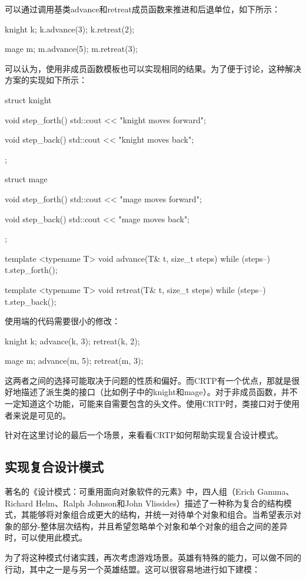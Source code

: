 可以通过调用基类advance和retreat成员函数来推进和后退单位，如下所示：

\begin{cpp}
knight k;
k.advance(3);
k.retreat(2);

mage m;
m.advance(5);
m.retreat(3);
\end{cpp}

可以认为，使用非成员函数模板也可以实现相同的结果。为了便于讨论，这种解决方案的实现如下所示：

\begin{cpp}
struct knight
{
	void step_forth()
	{ std::cout << "knight moves forward\n"; }
	
	void step_back()
	{ std::cout << "knight moves back\n"; }
};

struct mage
{
	void step_forth()
	{ std::cout << "mage moves forward\n"; }
	
	void step_back()
	{ std::cout << "mage moves back\n"; }
};

template <typename T>
void advance(T& t, size_t steps)
{
	while (steps--) t.step_forth();
}

template <typename T>
void retreat(T& t, size_t steps)
{
	while (steps--) t.step_back();
}
\end{cpp}

使用端的代码需要很小的修改：

\begin{cpp}
knight k;
advance(k, 3);
retreat(k, 2);

mage m;
advance(m, 5);
retreat(m, 3);
\end{cpp}

这两者之间的选择可能取决于问题的性质和偏好。而CRTP有一个优点，那就是很好地描述了派生类的接口（比如例子中的knight和mage）。对于非成员函数，并不一定知道这个功能，可能来自需要包含的头文件。使用CRTP时，类接口对于使用者来说是可见的。

针对在这里讨论的最后一个场景，来看看CRTP如何帮助实现复合设计模式。

\subsection{实现复合设计模式}

著名的《设计模式：可重用面向对象软件的元素》中，四人组（Erich Gamma、Richard Helm、Ralph Johnson和John Vlissides）描述了一种称为复合的结构模式，其能够将对象组合成更大的结构，并统一对待单个对象和组合。当希望表示对象的部分-整体层次结构，并且希望忽略单个对象和单个对象的组合之间的差异时，可以使用此模式。

为了将这种模式付诸实践，再次考虑游戏场景。英雄有特殊的能力，可以做不同的行动，其中之一是与另一个英雄结盟。这可以很容易地进行如下建模：


